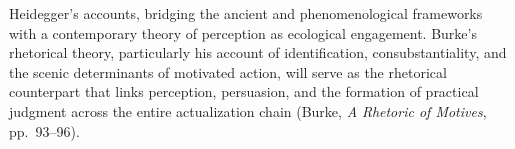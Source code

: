 \documentclass[12pt]{article}
\begin{document}
Heidegger's accounts, bridging the ancient and phenomenological frameworks with a contemporary theory of perception as ecological engagement. Burke's rhetorical theory, particularly his account of identification, consubstantiality, and the scenic determinants of motivated action, will serve as the rhetorical counterpart that links perception, persuasion, and the formation of practical judgment across the entire actualization chain (Burke, \textit{A Rhetoric of Motives}, pp.~93--96).
\end{document}
